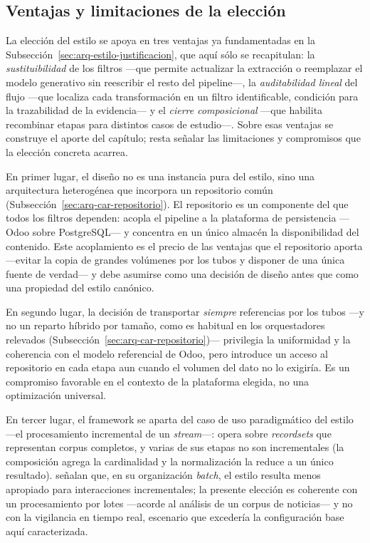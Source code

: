 \documentclass[12pt]{report}
\begin{document}
\subsection{Ventajas y limitaciones de la elección}
\label{sec:arq-car-analisis}

La elección del estilo se apoya en tres ventajas ya fundamentadas en la Subsección~\ref{sec:arq-estilo-justificacion}, que aquí sólo se recapitulan: la \textit{sustituibilidad} de los filtros ---que permite actualizar la extracción o reemplazar el modelo generativo sin reescribir el resto del pipeline---, la \textit{auditabilidad lineal} del flujo ---que localiza cada transformación en un filtro identificable, condición para la trazabilidad de la evidencia--- y el \textit{cierre composicional} ---que habilita recombinar etapas para distintos casos de estudio---. Sobre esas ventajas se construye el aporte del capítulo; resta señalar las limitaciones y compromisos que la elección concreta acarrea.

En primer lugar, el diseño no es una instancia pura del estilo, sino una arquitectura heterogénea que incorpora un repositorio común (Subsección~\ref{sec:arq-car-repositorio}). El repositorio es un componente del que todos los filtros dependen: acopla el pipeline a la plataforma de persistencia ---Odoo sobre PostgreSQL--- y concentra en un único almacén la disponibilidad del contenido. Este acoplamiento es el precio de las ventajas que el repositorio aporta ---evitar la copia de grandes volúmenes por los tubos y disponer de una única fuente de verdad--- y debe asumirse como una decisión de diseño antes que como una propiedad del estilo canónico.

En segundo lugar, la decisión de transportar \textit{siempre} referencias por los tubos ---y no un reparto híbrido por tamaño, como es habitual en los orquestadores relevados (Subsección~\ref{sec:arq-car-repositorio})--- privilegia la uniformidad y la coherencia con el modelo referencial de Odoo, pero introduce un acceso al repositorio en cada etapa aun cuando el volumen del dato no lo exigiría. Es un compromiso favorable en el contexto de la plataforma elegida, no una optimización universal.

En tercer lugar, el framework se aparta del caso de uso paradigmático del estilo ---el procesamiento incremental de un \textit{stream}---: opera sobre \textit{recordsets} que representan corpus completos, y varias de sus etapas no son incrementales (la composición agrega la cardinalidad y la normalización la reduce a un único resultado). \citet{garlanshaw:1994} señalan que, en su organización \textit{batch}, el estilo resulta menos apropiado para interacciones incrementales; la presente elección es coherente con un procesamiento por lotes ---acorde al análisis de un corpus de noticias--- y no con la vigilancia en tiempo real, escenario que excedería la configuración base aquí caracterizada.
\end{document}
